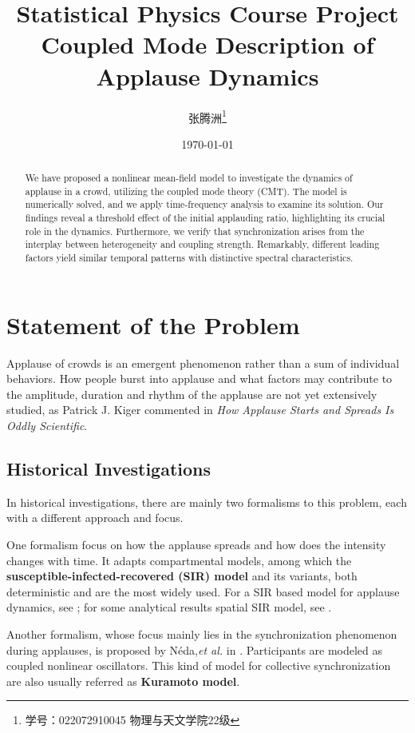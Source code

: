 \documentclass[UTF8,a4paper,11pt]{ctexart}
\title{
Statistical Physics Course Project\\
\vspace{0.5em}
Coupled Mode Description of Applause Dynamics
}
\author{
张腾洲\thanks{学号：022072910045 \hspace{1em} 物理与天文学院22级}
}
\date{\today}
\begin{document}
\maketitle
\begin{abstract}
    We have proposed a nonlinear mean-field model to investigate the dynamics of applause in a crowd, utilizing the coupled mode theory (CMT). The model is numerically solved, and we apply time-frequency analysis to examine its solution. Our findings reveal a threshold effect of the initial applauding ratio, highlighting its crucial role in the dynamics. Furthermore, we verify that synchronization arises from the interplay between heterogeneity and coupling strength. Remarkably, different leading factors yield similar temporal patterns with distinctive spectral characteristics.
\end{abstract}

\newpage
\tableofcontents

\newpage

\section{Statement of the Problem}

Applause of crowds is an emergent phenomenon rather than a sum of individual behaviors. How people burst into applause and what factors may contribute to the amplitude, duration and rhythm of the applause are not yet extensively studied, as Patrick J. Kiger commented in \emph{How Applause Starts and Spreads Is Oddly Scientific}.

\subsection{Historical Investigations}

In historical investigations, there are mainly two formalisms to this problem, each with a different approach and focus.

One formalism focus on how the applause spreads and how does the intensity changes with time. It adapts compartmental models, among which the \textbf{susceptible-infected-recovered (SIR) model} and its variants, both deterministic  and are the most widely used. For a SIR based model for applause dynamics, see \cite{mann2013dynamics}; for some analytical results spatial SIR model, see \cite{PhysRevE.82.051921}.

Another formalism, whose focus mainly lies in the synchronization phenomenon during applauses, is proposed by N\'eda,\emph{et al.} in \cite{appPRE,neda2000sound}. Participants are modeled as coupled nonlinear oscillators. This kind of model for collective synchronization are also usually referred as \textbf{Kuramoto model}\cite{kuramoto1975self}.
\end{document}
